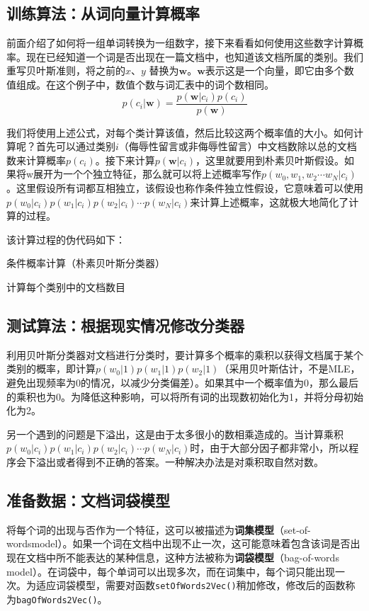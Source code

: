 \subsection{训练算法：从词向量计算概率}
前面介绍了如何将一组单词转换为一组数字，接下来看看如何使用这些数字计算概率。现在已经知道一个词是否出现在一篇文档中，也知道该文档所属的类别。我们重写贝叶斯准则，将之前的$x$、$y$ 替换为$\bm{w}$。$\bm{w}$表示这是一个向量，即它由多个数值组成。在这个例子中，数值个数与词汇表中的词个数相同。
\begin{equation*}
    p(c_i|\bm{w})=\frac{p(\bm{w}|c_i)p(c_i)}{p(\bm{w})}
\end{equation*}

我们将使用上述公式，对每个类计算该值，然后比较这两个概率值的大小。如何计算呢？首先可以通过类别$i$（侮辱性留言或非侮辱性留言）中文档数除以总的文档数来计算概率$p(c_i)$。接下来计算$p(\bm{w}|c_i)$，这里就要用到朴素贝叶斯假设。如果将w展开为一个个独立特征，那么就可以将上述概率写作$p(w_0,w_1,w_2\cdots w_N|c_i)$。这里假设所有词都互相独立，该假设也称作条件独立性假设，它意味着可以使用$p(w_0|c_i)p(w_1|c_i)p(w_2|c_i)\cdots p(w_N|c_i)$来计算上述概率，这就极大地简化了计算的过程。

该计算过程的伪代码如下：
\begin{algorithm}
    \caption{条件概率计算（朴素贝叶斯分类器）}
    计算每个类别中的文档数目\;
\end{algorithm}
\subsection{测试算法：根据现实情况修改分类器}
利用贝叶斯分类器对文档进行分类时，要计算多个概率的乘积以获得文档属于某个类别的概率，即计算$p(w_0|1)p(w_1|1)p(w_2|1)$（采用贝叶斯估计，不是MLE，避免出现频率为0的情况，以减少分类偏差）。如果其中一个概率值为0，那么最后的乘积也为0。为降低这种影响，可以将所有词的出现数初始化为1，并将分母初始化为2。

另一个遇到的问题是下溢出，这是由于太多很小的数相乘造成的。当计算乘积$p(w_0|c_i)p(w_1|c_i)p(w_2|c_i)\cdots p(w_N|c_i)$时，由于大部分因子都非常小，所以程序会下溢出或者得到不正确的答案。一种解决办法是对乘积取自然对数。

\subsection{准备数据：文档词袋模型}
将每个词的出现与否作为一个特征，这可以被描述为\textbf{词集模型}（set-of-wordsmodel）。如果一个词在文档中出现不止一次，这可能意味着包含该词是否出现在文档中所不能表达的某种信息，这种方法被称为\textbf{词袋模型}（bag-of-words model）。在词袋中，每个单词可以出现多次，而在词集中，每个词只能出现一次。为适应词袋模型，需要对函数\verb|setOfWords2Vec()|稍加修改，修改后的函数称为\verb|bagOfWords2Vec()|。

